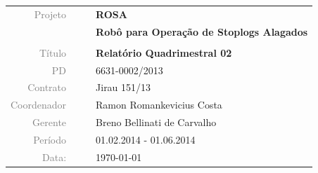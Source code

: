\vspace{4cm}

\begin{table}[ht!]
	\centering
	\begin{tabular}{r l|l p{12cm} }
		\textcolor{gray}{Projeto} &&& \textbf{\Large ROSA}\\
			&&& \textbf{Robô para Operação de Stoplogs Alagados}\\
			&&& \\
		\textcolor{gray}{Título} &&& \textbf{Relatório Quadrimestral 02}\\
		\textcolor{gray}{PD} &&& 6631-0002/2013 \\
		\textcolor{gray}{Contrato} &&& Jirau 151/13\\
		\textcolor{gray}{Coordenador} &&& Ramon Romankevicius Costa \\
		\textcolor{gray}{Gerente} &&& Breno Bellinati de Carvalho \\
		\textcolor{gray}{Período} &&& 01.02.2014 - 01.06.2014 \\
		\textcolor{gray}{Data:} &&& \today \\
	\end{tabular}
\end{table}


\cleardoublepage


\thispagestyle{empty}


